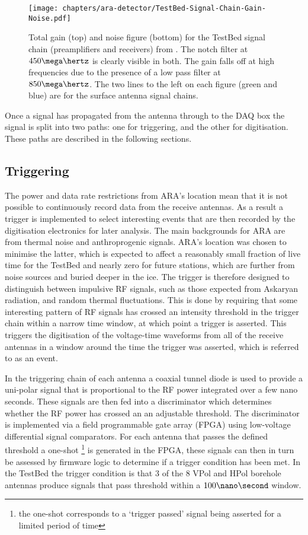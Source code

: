 \begin{figure}[htpb]
  \centering
  \texttt{[image: chapters/ara-detector/TestBed-Signal-Chain-Gain-Noise.pdf]}
  \caption{Total gain (top) and noise figure (bottom) for the TestBed signal chain (preamplifiers and receivers) from \cite{Allison2012457}. The notch filter at $450 \mega\hertz$ is clearly visible in both. The gain falls off at high frequencies due to the presence of a low pass filter at $850 \mega \hertz$. The two lines to the left on each figure (green and blue) are for the surface antenna signal chains.}
  \label{fig:ara-detector:TestBed:Signal-Chain:Gain-Noise}
\end{figure}

Once a signal has propagated from the antenna through to the DAQ box the signal is split into two paths: one for triggering, and the other for digitisation. These paths are described in the following sections.

\subsection{Triggering}
\label{sec:ara-detector:TestBed:Triggering}

The power and data rate restrictions from ARA's location mean that it is not possible to continuously record data from the receive antennas. As a result a trigger is implemented to select interesting events that are then recorded by the digitisation electronics for later analysis. The main backgrounds for ARA are from thermal noise and anthroprogenic signals. ARA's location was chosen to minimise the latter, which is expected to affect a reasonably small fraction of live time for the TestBed and nearly zero for future stations, which are further from noise sources and buried deeper in the ice. The trigger is therefore designed to distinguish between impulsive RF signals, such as those expected from Askaryan radiation, and random thermal fluctuations. This is done by requiring that some interesting pattern of RF signals has crossed an intensity threshold in the trigger chain within a narrow time window, at which point a trigger is asserted. This triggers the digitisation of the voltage-time waveforms from all of the receive antennas in a window around the time the trigger was asserted, which is referred to as an event.

In the triggering chain of each antenna a coaxial tunnel diode is used to provide a uni-polar signal that is proportional to the RF power integrated over a few nano seconds. These signals are then fed into a discriminator which determines whether the RF power has crossed an an adjustable threshold. The discriminator is implemented via a field programmable gate array (FPGA) using low-voltage differential signal comparators. For each antenna that passes the defined threshold a one-shot \footnote{the one-shot corresponds to a `trigger passed' signal being asserted for a limited period of time} is generated in the FPGA, these signals can then in turn be assessed by firmware logic to determine if a trigger condition has been met. In the TestBed the trigger condition is that 3 of the 8 VPol and HPol borehole antennas produce signals that pass threshold within a $100 \nano\second$ window. 

